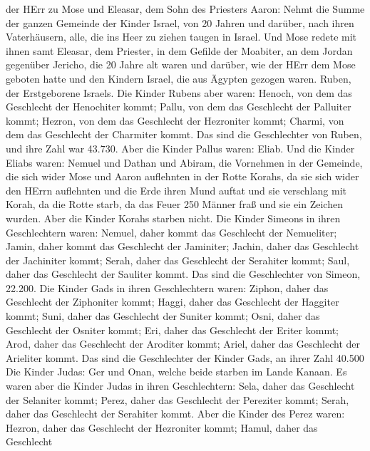der HErr zu Mose und Eleasar, dem Sohn des Priesters Aaron: 
Nehmt die Summe der ganzen Gemeinde der Kinder Israel, von 20 Jahren und
darüber, nach ihren Vaterhäusern, alle, die ins Heer zu ziehen taugen in
Israel.  Und Mose redete mit ihnen samt Eleasar, dem
Priester, in dem Gefilde der Moabiter, an dem Jordan gegenüber Jericho,
 die 20 Jahre alt waren und darüber, wie der HErr dem Mose
geboten hatte und den Kindern Israel, die aus Ägypten gezogen waren.
 Ruben, der Erstgeborene Israels. Die Kinder Rubens aber
waren: Henoch, von dem das Geschlecht der Henochiter kommt; Pallu, von
dem das Geschlecht der Palluiter kommt;  Hezron, von dem das
Geschlecht der Hezroniter kommt; Charmi, von dem das Geschlecht der
Charmiter kommt.  Das sind die Geschlechter von Ruben, und
ihre Zahl war 43.730.  Aber die Kinder Pallus waren: Eliab.
 Und die Kinder Eliabs waren: Nemuel und Dathan und Abiram,
die Vornehmen in der Gemeinde, die sich wider Mose und Aaron auflehnten
in der Rotte Korahs, da sie sich wider den HErrn auflehnten
 und die Erde ihren Mund auftat und sie verschlang mit
Korah, da die Rotte starb, da das Feuer 250 Männer fraß und sie ein
Zeichen wurden.  Aber die Kinder Korahs starben nicht.
 Die Kinder Simeons in ihren Geschlechtern waren: Nemuel,
daher kommt das Geschlecht der Nemueliter; Jamin, daher kommt das
Geschlecht der Jaminiter; Jachin, daher das Geschlecht der Jachiniter
kommt;  Serah, daher das Geschlecht der Serahiter kommt;
Saul, daher das Geschlecht der Sauliter kommt.  Das sind
die Geschlechter von Simeon, 22.200.  Die Kinder Gads in
ihren Geschlechtern waren: Ziphon, daher das Geschlecht der Ziphoniter
kommt; Haggi, daher das Geschlecht der Haggiter kommt; Suni, daher das
Geschlecht der Suniter kommt;  Osni, daher das Geschlecht
der Osniter kommt; Eri, daher das Geschlecht der Eriter kommt;
 Arod, daher das Geschlecht der Aroditer kommt; Ariel,
daher das Geschlecht der Arieliter kommt.  Das sind die
Geschlechter der Kinder Gads, an ihrer Zahl 40.500  Die
Kinder Judas: Ger und Onan, welche beide starben im Lande Kanaan.
 Es waren aber die Kinder Judas in ihren Geschlechtern:
Sela, daher das Geschlecht der Selaniter kommt; Perez, daher das
Geschlecht der Pereziter kommt; Serah, daher das Geschlecht der
Serahiter kommt.  Aber die Kinder des Perez waren: Hezron,
daher das Geschlecht der Hezroniter kommt; Hamul, daher das Geschlecht

